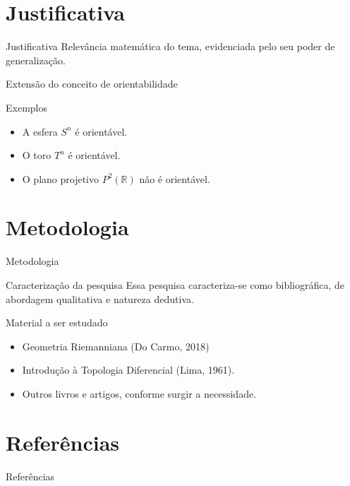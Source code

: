 \documentclass[aspectratio=169]{beamer}
\begin{document}
\section{Justificativa}

\begin{frame}{Justificativa}
    Relevância matemática do tema, evidenciada pelo seu poder de generalização.
\end{frame}

\begin{frame}{Extensão do conceito de orientabilidade}
    \begin{block}{Exemplos}
        \begin{itemize}
            \item A esfera $S^n$ é orientável.
            \item O toro $T^n$ é orientável.
            \item O plano projetivo $P^2(\mathbb{R})$ não é orientável.
        \end{itemize}
    \end{block}
\end{frame}


\section{Metodologia}

\begin{frame}{Metodologia}
    \begin{alertblock}{Caracterização da pesquisa}
        Essa pesquisa caracteriza-se como bibliográfica, de abordagem qualitativa e natureza dedutiva.
    \end{alertblock}
    \begin{block}{Material a ser estudado}
        \begin{itemize}
            \item Geometria Riemanniana (Do Carmo, 2018)
            \item Introdução à Topologia Diferencial (Lima, 1961).
            \item Outros livros e artigos, conforme surgir a necessidade.
        \end{itemize}
    \end{block}
\end{frame}

\section{Referências}

\begin{frame}[allowframebreaks]{Referências}
    \nocite{*}
    \printbibliography
\end{frame}
\end{document}
